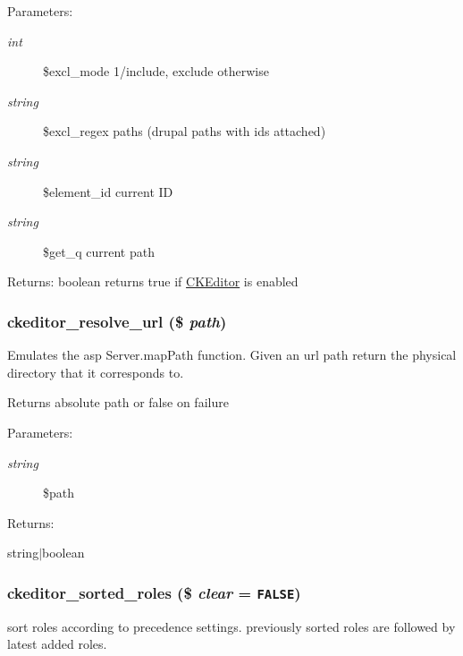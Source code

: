 \begin{Desc}
\item[Parameters:]
\begin{description}
\item[{\em int}]\$excl\_\-mode 1/include, exclude otherwise \item[{\em string}]\$excl\_\-regex paths (drupal paths with ids attached) \item[{\em string}]\$element\_\-id current ID \item[{\em string}]\$get\_\-q current path\end{description}
\end{Desc}
\begin{Desc}
\item[Returns:]boolean returns true if \hyperlink{classCKEditor}{CKEditor} is enabled \end{Desc}
\hypertarget{ckeditor_8lib_8inc_7514d6bcd3e03a13ed52165fabe52b7b}{
\subsubsection[{ckeditor\_\-resolve\_\-url}]{\setlength{\rightskip}{0pt plus 5cm}ckeditor\_\-resolve\_\-url (\$ {\em path})}}
\label{ckeditor_8lib_8inc_7514d6bcd3e03a13ed52165fabe52b7b}


Emulates the asp Server.mapPath function. Given an url path return the physical directory that it corresponds to.

Returns absolute path or false on failure

\begin{Desc}
\item[Parameters:]
\begin{description}
\item[{\em string}]\$path \end{description}
\end{Desc}
\begin{Desc}
\item[Returns:]

string$|$boolean \end{Desc}
\hypertarget{ckeditor_8lib_8inc_e4ce1fe78d83986dc783082a58964b7f}{
\subsubsection[{ckeditor\_\-sorted\_\-roles}]{\setlength{\rightskip}{0pt plus 5cm}ckeditor\_\-sorted\_\-roles (\$ {\em clear} = {\tt FALSE})}}
\label{ckeditor_8lib_8inc_e4ce1fe78d83986dc783082a58964b7f}


sort roles according to precedence settings. previously sorted roles are followed by latest added roles. 